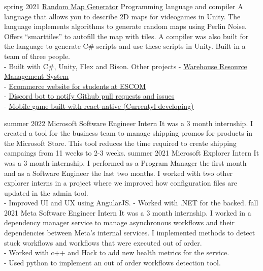 \documentclass[9pt]{developercv} %
\begin{document}


\begin{entrylist}
	\entry
		{spring 2021}
		{\href{https://github.com/DanielMontesGuerrero/random-map-generator}{Random Map Generator}}
		{Programming language and compiler}
		{A language that allows you to describe 2D maps for videogames in Unity. The language implements algorithms to generate random maps using Perlin Noise. Offers ``smarttiles'' to autofill the map with tiles. A compiler was also built for the language to generate C\# scripts and use these scripts in Unity. Built in a team of three people.\\
		- Built with C\#, Unity, Flex and Bison.}
	\entry
		{}
		{Other projects}
		{}
		{
			- \href{https://github.com/DanielMontesGuerrero/sistema-picking-app}{Warehouse Resource Management System}\\
			- \href{https://github.com/DanielMontesGuerrero/la-tiendita}{Ecommerce website for students at ESCOM}\\
			- \href{https://github.com/DanielMontesGuerrero/anigitbot}{Discord bot to notify Github pull requests and issues}\\
			- \href{https://github.com/CatadoresDeAnime/potential-octo-meme}{Mobile game built with react native (Currentyl developing)}
		}
\end{entrylist}


\begin{entrylist}
	\entry
		{summer 2022}
		{Microsoft}
		{Software Engineer Intern}
		{It was a 3 month internship. I created a tool for the business team to manage shipping promos for products in the Microsoft Store. This tool reduces the time required to create shipping campaings from 11 weeks to 2-3 weeks.}
	\entry
		{summer 2021}
		{Microsoft}
		{Explorer Intern}
		{It was a 3 month internship. I performed as a Program Manager the first month and as a Software Engineer the last two months. I worked with two other explorer interns in a project where we improved how configuration files are updated in the admin tool.\\
		- Improved UI and UX using AngularJS.
		- Worked with .NET for the backed.}
	\entry
		{fall 2021}
		{Meta}
		{Software Engineer Intern}
		{It was a 3 month internship. I worked in a dependency manager service to manage asynchronous workflows and their dependencies between Meta's internal services. I implemented methods to detect stuck workflows and workflows that were executed out of order.\\
		- Worked with c++ and Hack to add new health metrics for the service.\\
		- Used python to implement an out of order workflows detection tool.\\
		}
\end{entrylist}
\end{document}
